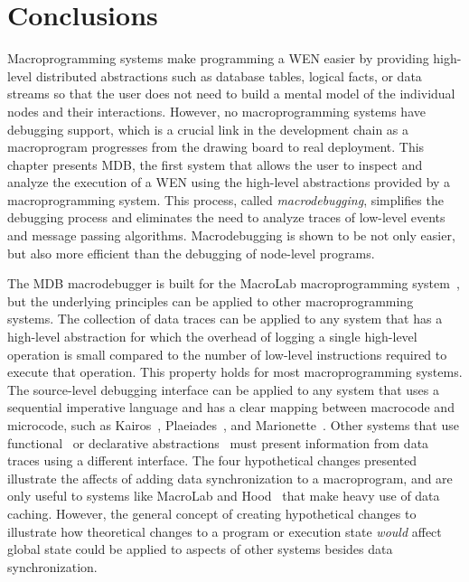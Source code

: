 \section{Conclusions} \label{conclusion}

Macroprogramming systems make programming a WEN easier by providing high-level
distributed abstractions such as database tables, logical facts, or data streams
so that the user does not need to build a mental model of the individual nodes
and their interactions.  However, no macroprogramming systems have debugging
support, which is a crucial link in the development chain as a macroprogram
progresses from the drawing board to real deployment. This chapter presents MDB,
the first system that allows the user to inspect and analyze the execution of a
WEN using the high-level abstractions provided by a macroprogramming system.
This process, called \emph{macrodebugging}, simplifies the debugging process and
eliminates the need to analyze traces of low-level events and message passing
algorithms. Macrodebugging is shown to be not only easier, but also more
efficient than the debugging of node-level programs.

The MDB macrodebugger is built for the MacroLab macroprogramming
system~\cite{Hnat2008}, but the underlying principles can be applied to other
macroprogramming systems.  The collection of data traces can be applied to any
system that has a high-level abstraction for which the overhead of logging a
single high-level operation is small compared to the number of low-level
instructions required to execute that operation.  This property holds for most
macroprogramming systems.  The source-level debugging interface can be applied
to any system that uses a sequential imperative language and has a clear mapping
between macrocode and microcode, such as Kairos~\cite{Gummadi},
Plaeiades~\cite{Kothari}, and Marionette~\cite{Whitehouseb}.  Other systems that
use functional~\cite{Newton} or declarative abstractions~\cite{Madden} must
present information from data traces using a different interface.  The four
hypothetical changes presented illustrate the affects of adding data
synchronization to a macroprogram, and are only useful to systems like MacroLab
and Hood~\cite{Whitehousea} that make heavy use of data caching.  However, the
general concept of creating hypothetical changes to illustrate how theoretical
changes to a program or execution state \emph{would} affect global state could
be applied to aspects of other systems besides data synchronization.

